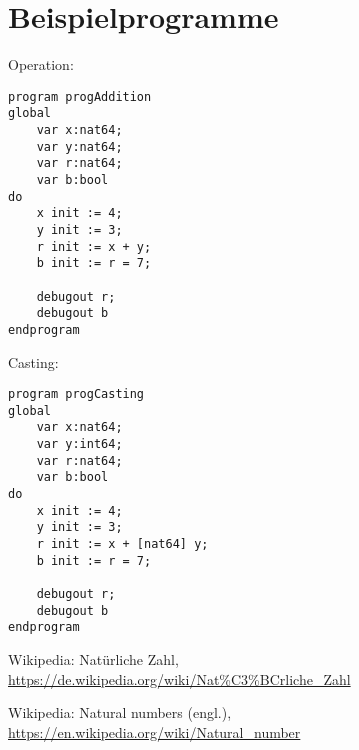 \documentclass[10pt, a4paper, twocolumn]{article} %
\begin{document}
\section{Beispielprogramme}
\label{sec:prog}
Operation:
\begin{lstlisting}
program progAddition
global
    var x:nat64;
    var y:nat64;
    var r:nat64;
    var b:bool
do
    x init := 4;
    y init := 3;
    r init := x + y;
    b init := r = 7;

    debugout r;
    debugout b
endprogram
\end{lstlisting}
Casting:
\begin{lstlisting}
program progCasting
global
    var x:nat64;
    var y:int64;
    var r:nat64;
    var b:bool
do
    x init := 4;
    y init := 3;
    r init := x + [nat64] y;
    b init := r = 7;

    debugout r;
    debugout b
endprogram
\end{lstlisting}


\begin{thebibliography}{9}
	Wikipedia: Natürliche Zahl,
	\url{https://de.wikipedia.org/wiki/Nat\%C3\%BCrliche_Zahl}

    Wikipedia: Natural numbers (engl.),
    \url{https://en.wikipedia.org/wiki/Natural_number}


\end{thebibliography}
\end{document}
